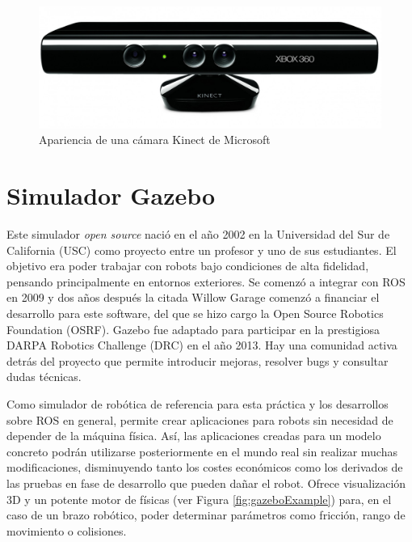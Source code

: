 \documentclass[12pt,spanish,chapterprefix, numbers=noenddot]{book}
\numberwithin{equation}{section}
\numberwithin{figure}{section}
\begin{document}
\begin{figure}[hbt!]
\centering
\includegraphics[width=12cm]{Figs/kinect.jpg}
\par
\caption{\label{fig:kinect}Apariencia de una cámara Kinect de Microsoft}
\end{figure}

\section{Simulador Gazebo}
Este simulador \textit{open source} nació en el año 2002 en la Universidad del Sur de California (USC) como proyecto entre un profesor y uno de sus estudiantes. El objetivo era poder trabajar con robots bajo condiciones de alta fidelidad, pensando principalmente en entornos exteriores. Se comenzó a integrar con ROS en 2009 y dos años después la citada Willow Garage comenzó a financiar el desarrollo para este software, del que se hizo cargo la Open Source Robotics Foundation (OSRF).
Gazebo \cite{gazebo} fue adaptado para participar en la prestigiosa DARPA Robotics Challenge (DRC) en el año 2013. Hay una comunidad activa detrás del proyecto que permite introducir mejoras, resolver bugs y consultar dudas técnicas.

Como simulador de robótica de referencia para esta práctica y los desarrollos sobre ROS en general, permite crear aplicaciones para robots sin necesidad de depender de la máquina física. Así, las aplicaciones creadas para un modelo concreto podrán utilizarse posteriormente en el mundo real sin  realizar muchas modificaciones, disminuyendo tanto los costes económicos como los derivados de las pruebas en fase de desarrollo que pueden dañar el robot. 
Ofrece visualización 3D y un potente motor de físicas (ver Figura \ref{fig:gazeboExample}) para, en el caso de un brazo robótico, poder determinar parámetros como fricción, rango de movimiento o colisiones.
\end{document}
